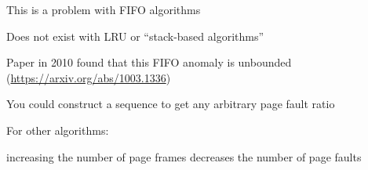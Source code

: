 \begin{slide}


    This is a problem with FIFO algorithms

    \leftspace{}Does not exist with LRU or ``stack-based algorithms''
    \medskip

    Paper in 2010 found that this FIFO anomaly is unbounded (\url{https://arxiv.org/abs/1003.1336})

    \leftspace{}You could construct a sequence to get any arbitrary page fault ratio
    \medskip

    For other algorithms:

    \leftspace{}increasing the number of page frames decreases the number of
    page faults

\end{slide}

